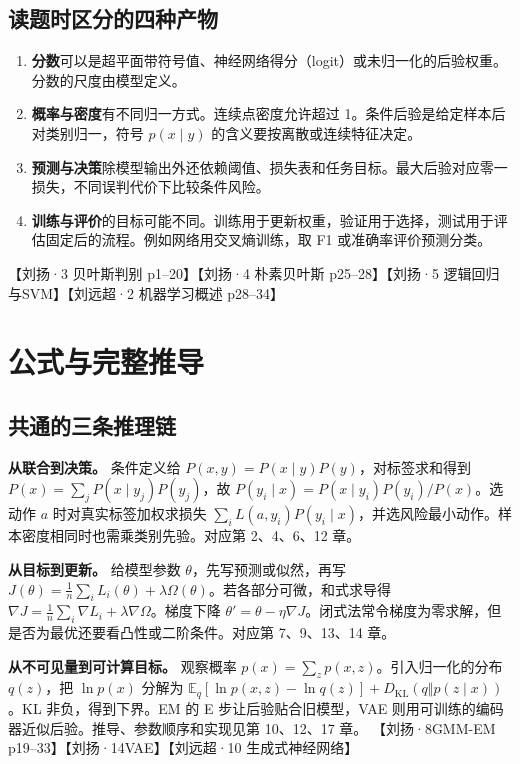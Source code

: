 \documentclass[UTF8,a4paper,zihao=-4,fontset=fandol]{ctexrep}
\begin{document}
\subsection{读题时区分的四种产物}
\begin{enumerate}
\item \textbf{分数}可以是超平面带符号值、神经网络得分（logit）或未归一化的后验权重。分数的尺度由模型定义。
\item \textbf{概率与密度}有不同归一方式。连续点密度允许超过 1。条件后验是给定样本后对类别归一，符号 $p(x\mid y)$ 的含义要按离散或连续特征决定。
\item \textbf{预测与决策}除模型输出外还依赖阈值、损失表和任务目标。最大后验对应零一损失，不同误判代价下比较条件风险。
\item \textbf{训练与评价}的目标可能不同。训练用于更新权重，验证用于选择，测试用于评估固定后的流程。例如网络用交叉熵训练，取 F1 或准确率评价预测分类。
\end{enumerate}
【刘扬·3 贝叶斯判别 p1–20】【刘扬·4 朴素贝叶斯 p25–28】【刘扬·5 逻辑回归与SVM】【刘远超·2 机器学习概述 p28–34】

\section{公式与完整推导}
\subsection{共通的三条推理链}
\textbf{从联合到决策。} 条件定义给 $P(x,y)=P(x\mid y)P(y)$，对标签求和得到 $P(x)=\sum_jP(x\mid y_j)P(y_j)$，故 $P(y_i\mid x)=P(x\mid y_i)P(y_i)/P(x)$。选动作 $a$ 时对真实标签加权求损失 $\sum_i L(a,y_i)P(y_i\mid x)$，并选风险最小动作。样本密度相同时也需乘类别先验。对应第 2、4、6、12 章。

\textbf{从目标到更新。} 给模型参数 $\theta$，先写预测或似然，再写 $J(\theta)=\frac1n\sum_iL_i(\theta)+\lambda\Omega(\theta)$。若各部分可微，和式求导得 $\nabla J=\frac1n\sum_i\nabla L_i+\lambda\nabla\Omega$。梯度下降 $\theta'=\theta-\eta\nabla J$。闭式法常令梯度为零求解，但是否为最优还要看凸性或二阶条件。对应第 7、9、13、14 章。

\textbf{从不可见量到可计算目标。} 观察概率 $p(x)=\sum_zp(x,z)$。引入归一化的分布 $q(z)$，把 $\ln p(x)$ 分解为 $\mathbb E_q[\ln p(x,z)-\ln q(z)]+D_{\mathrm{KL}}(q\Vert p(z\mid x))$。KL 非负，得到下界。EM 的 E 步让后验贴合旧模型，VAE 则用可训练的编码器近似后验。推导、参数顺序和实现见第 10、12、17 章。 【刘扬·8GMM-EM p19–33】【刘扬·14VAE】【刘远超·10 生成式神经网络】
\end{document}
